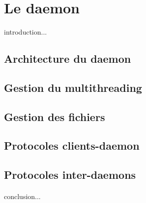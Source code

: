 
\section*{Le daemon}

	\paragraph{}introduction...
	
	\subsection*{Architecture du daemon}
	
	\subsection*{Gestion du multithreading}
	
	\subsection*{Gestion des fichiers}
	
	\subsection*{Protocoles clients-daemon}
	
	\subsection*{Protocoles inter-daemons}

	\paragraph*{}conclusion...